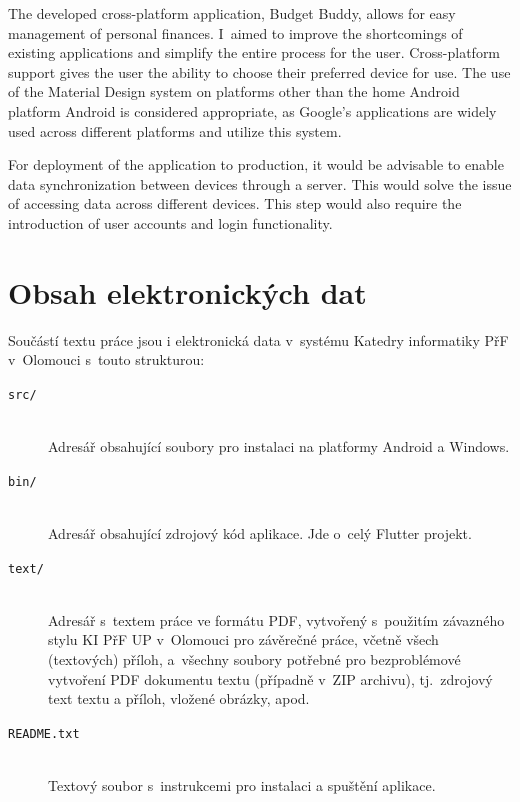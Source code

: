 \documentclass[
  biblatex,
  figures=true,
  tables=false,
  glossaries,
  index
]{kidiplom}
\begin{document}
\begin{kiconclusions}[english]
The developed cross-platform application, Budget Buddy, allows for easy management of personal finances. I~aimed to improve the shortcomings of existing applications and simplify the entire process for the user. Cross-platform support gives the user the ability to choose their preferred device for use. The use of the Material Design system on platforms other than the home Android platform Android is considered appropriate, as Google’s applications are widely used across different platforms and utilize this system.

For deployment of the application to production, it would be advisable to enable data synchronization between devices through a server. This would solve the issue of accessing data across different devices. This step would also require the introduction of user accounts and login functionality.
\end{kiconclusions}

\appendix
\section{Obsah elektronických dat} \label{sec:ObsahElData}
Součástí textu práce jsou i elektronická data v~systému Katedry informatiky PřF v~Olomouci s~touto strukturou:

\begin{description}

  \item[\texttt{src/}] \hfill \\
    Adresář obsahující soubory pro instalaci na platformy Android a Windows.
  \item[\texttt{bin/}] \hfill \\
    Adresář obsahující zdrojový kód aplikace. Jde o~celý Flutter projekt.
  \item[\texttt{text/}] \hfill \\
    Adresář s~textem práce ve formátu PDF, vytvořený s~použitím
    závazného stylu KI PřF UP v~Olomouci pro závěrečné práce, včetně
    všech (textových) příloh, a~všechny soubory potřebné pro
    bezproblémové vytvoření PDF dokumentu textu (případně v~ZIP
    archivu), tj.~zdrojový text textu a příloh, vložené obrázky, apod.
  \item[\texttt{README.txt}] \hfill \\
    Textový soubor s~instrukcemi pro instalaci a spuštění aplikace.

\end{description}
\end{document}
